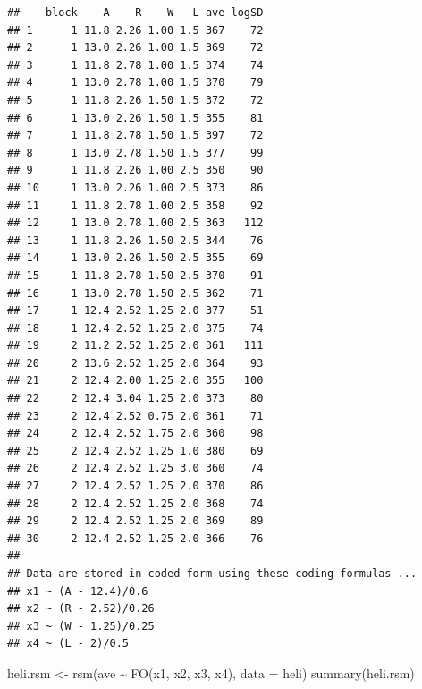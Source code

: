 \documentclass[
]{book}
\newenvironment{Shaded}{\begin{snugshade}}{\end{snugshade}}
\newcommand{\AttributeTok}[1]{\textcolor[rgb]{0.77,0.63,0.00}{#1}}
\newcommand{\FunctionTok}[1]{\textcolor[rgb]{0.00,0.00,0.00}{#1}}
\newcommand{\NormalTok}[1]{#1}
\newcommand{\OtherTok}[1]{\textcolor[rgb]{0.56,0.35,0.01}{#1}}
\newcommand{\SpecialCharTok}[1]{\textcolor[rgb]{0.00,0.00,0.00}{#1}}
\theoremstyle{definition}
\theoremstyle{definition}
\theoremstyle{definition}
\theoremstyle{definition}
\theoremstyle{remark}
\begin{document}
\begin{verbatim}
##    block    A    R    W   L ave logSD
## 1      1 11.8 2.26 1.00 1.5 367    72
## 2      1 13.0 2.26 1.00 1.5 369    72
## 3      1 11.8 2.78 1.00 1.5 374    74
## 4      1 13.0 2.78 1.00 1.5 370    79
## 5      1 11.8 2.26 1.50 1.5 372    72
## 6      1 13.0 2.26 1.50 1.5 355    81
## 7      1 11.8 2.78 1.50 1.5 397    72
## 8      1 13.0 2.78 1.50 1.5 377    99
## 9      1 11.8 2.26 1.00 2.5 350    90
## 10     1 13.0 2.26 1.00 2.5 373    86
## 11     1 11.8 2.78 1.00 2.5 358    92
## 12     1 13.0 2.78 1.00 2.5 363   112
## 13     1 11.8 2.26 1.50 2.5 344    76
## 14     1 13.0 2.26 1.50 2.5 355    69
## 15     1 11.8 2.78 1.50 2.5 370    91
## 16     1 13.0 2.78 1.50 2.5 362    71
## 17     1 12.4 2.52 1.25 2.0 377    51
## 18     1 12.4 2.52 1.25 2.0 375    74
## 19     2 11.2 2.52 1.25 2.0 361   111
## 20     2 13.6 2.52 1.25 2.0 364    93
## 21     2 12.4 2.00 1.25 2.0 355   100
## 22     2 12.4 3.04 1.25 2.0 373    80
## 23     2 12.4 2.52 0.75 2.0 361    71
## 24     2 12.4 2.52 1.75 2.0 360    98
## 25     2 12.4 2.52 1.25 1.0 380    69
## 26     2 12.4 2.52 1.25 3.0 360    74
## 27     2 12.4 2.52 1.25 2.0 370    86
## 28     2 12.4 2.52 1.25 2.0 368    74
## 29     2 12.4 2.52 1.25 2.0 369    89
## 30     2 12.4 2.52 1.25 2.0 366    76
## 
## Data are stored in coded form using these coding formulas ...
## x1 ~ (A - 12.4)/0.6
## x2 ~ (R - 2.52)/0.26
## x3 ~ (W - 1.25)/0.25
## x4 ~ (L - 2)/0.5
\end{verbatim}

\begin{Shaded}
\begin{Highlighting}[]
\NormalTok{heli.rsm }\OtherTok{\textless{}{-}} \FunctionTok{rsm}\NormalTok{(ave }\SpecialCharTok{\textasciitilde{}}  \FunctionTok{FO}\NormalTok{(x1, x2, x3, x4), }\AttributeTok{data =}\NormalTok{ heli)}
\FunctionTok{summary}\NormalTok{(heli.rsm)}
\end{Highlighting}
\end{Shaded}
\end{document}
